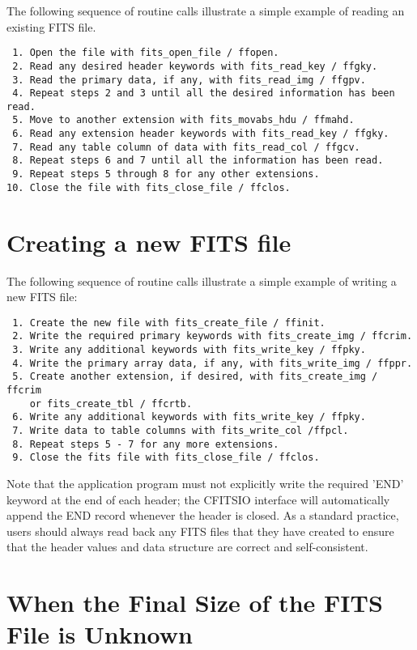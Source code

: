 The following sequence of routine calls illustrate a simple example
of reading an existing FITS file.

\begin{verbatim}
 1. Open the file with fits_open_file / ffopen.
 2. Read any desired header keywords with fits_read_key / ffgky.
 3. Read the primary data, if any, with fits_read_img / ffgpv.
 4. Repeat steps 2 and 3 until all the desired information has been read.
 5. Move to another extension with fits_movabs_hdu / ffmahd.
 6. Read any extension header keywords with fits_read_key / ffgky.
 7. Read any table column of data with fits_read_col / ffgcv.
 8. Repeat steps 6 and 7 until all the information has been read.
 9. Repeat steps 5 through 8 for any other extensions.
10. Close the file with fits_close_file / ffclos.
\end{verbatim}


\section{Creating a new FITS file}

The following sequence of routine calls illustrate a simple example
of writing a new FITS file:

\begin{verbatim}
 1. Create the new file with fits_create_file / ffinit.
 2. Write the required primary keywords with fits_create_img / ffcrim.
 3. Write any additional keywords with fits_write_key / ffpky.
 4. Write the primary array data, if any, with fits_write_img / ffppr.
 5. Create another extension, if desired, with fits_create_img / ffcrim
    or fits_create_tbl / ffcrtb.
 6. Write any additional keywords with fits_write_key / ffpky.
 7. Write data to table columns with fits_write_col /ffpcl.
 8. Repeat steps 5 - 7 for any more extensions.
 9. Close the fits file with fits_close_file / ffclos.
\end{verbatim}
Note that the application program must not explicitly write the
required 'END' keyword at the end of each header;  the CFITSIO interface
will automatically append the END record whenever the header is closed.
As a standard practice, users should always read back any FITS files
that they have created to ensure that the header values and data structure
are correct and self-consistent.


\section{When the Final Size of the FITS File is Unknown}

